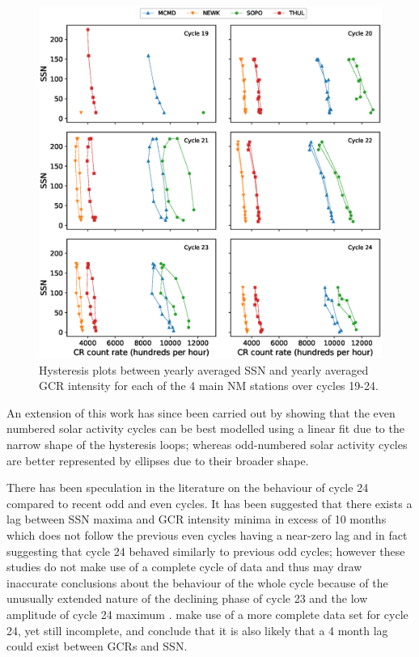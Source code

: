 \begin{figure}
	\includegraphics[width=\columnwidth]{all_hysteresis.eps}
	\caption{Hysteresis plots between yearly averaged SSN and yearly averaged GCR intensity for each of the 4 main NM stations over cycles 19-24.}
	\label{fig:all_hysteresis}
\end{figure}


An extension of this work has since been carried out by \citet{inceoglu_modeling_2014} showing that the even numbered solar activity cycles can be best modelled using a linear fit due to the narrow shape of the hysteresis loops; whereas odd-numbered solar activity cycles are better represented by ellipses due to their broader shape.

There has been speculation in the literature on the behaviour of cycle 24 compared to recent odd and even cycles. It has been suggested that there exists a lag between SSN maxima and GCR intensity minima in excess of 10 months \citep{kane_lags_2014, mishra_study_2016} which does not follow the previous even cycles having a near-zero lag and in fact suggesting that cycle 24 behaved similarly to previous odd cycles; however these studies do not make use of a complete cycle of data and thus may draw inaccurate conclusions about the behaviour of the whole cycle because of the unusually extended nature of the declining phase of cycle 23 and the low amplitude of cycle 24 maximum \citep{broomhall_helioseismic_2017}. \cite{mishra_study_2016} make use of a more complete data set for cycle 24, yet still incomplete, and conclude that it is also likely that a 4 month lag could exist between GCRs and SSN.

